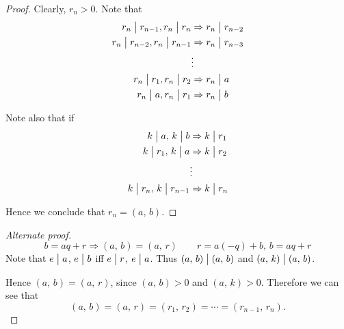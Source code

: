 \begin{proof}
    Clearly, $r_n > 0$.
    Note that
    \begin{align*}
        r_n \bigm| r_{n-1}, r_n \bigm| r_n &\Rightarrow r_n \bigm| r_{n-2} \\
        r_n \bigm| r_{n-2}, r_n \bigm| r_{n-1} &\Rightarrow r_n \bigm| r_{n-3} \\
        &\vdots \\
        r_n \bigm| r_1, r_n \bigm| r_2 &\Rightarrow r_n \bigm| a \\
        r_n \bigm| a, r_n \bigm| r_1 &\Rightarrow r_n \bigm| b
    \end{align*}

    Note also that if
    \begin{align*}
        k \bigm| a,\, k \bigm| b &\Rightarrow k\bigm| r_1 \\
        k \bigm| r_1,\, k \bigm| a &\Rightarrow k\bigm| r_2 \\
        &\vdots \\
        k \bigm| r_n,\, k \bigm| r_{n-1} &\Rightarrow k\bigm| r_n
    \end{align*}
    
    Hence we conclude that $r_n = \left(a,\,b\right)$.
\end{proof}

\begin{proof}[Alternate proof]
    \[
        b = aq + r \Rightarrow \left(a,\,b\right) = \left(a,\,r\right)
        \qquad
        r=a\left(-q\right)+b,\,b=aq+r
    \]
    Note that $e\bigm| a$, $e\bigm| b$ iff $e\bigm| r$, $e\bigm| a$.
    Thus $\left(a,\,b\right)\bigm|\left(a,\,b\right)$ and 
    $\left(a,\,k\right)\bigm|\left(a,\,b\right)$.

    Hence $\left(a,\,b\right) = \left(a,\,r\right)$, since $\left(a,\,b\right) > 0$ and
    $\left(a,\,k\right) > 0$. Therefore we can see that
    \[
        \left(a,\,b\right) = \left(a,\,r\right) = \left(r_1,\,r_2\right) = \cdots
        = \left(r_{n-1},\,r_n\right).
    \]
\end{proof}

